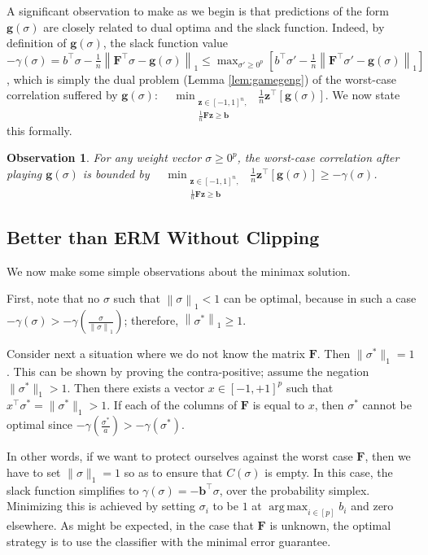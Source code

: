 \documentclass{colt2015} %
\newtheorem{obs}[thm]{Observation}
\newcommand{\vF}{\mathbf{F}}
\newcommand{\vb}{\mathbf{b}}
\newcommand{\vg}{\mathbf{g}}
\newcommand{\vz}{\mathbf{z}}
\DeclareMathOperator*{\argmax}{arg\,max}
\newcommand{\vnorm}[1]{\left\lVert#1\right\rVert} %
\newcommand{\lrp}[1]{\left(#1\right)}
\begin{document}
A significant observation to make as we begin 
is that predictions of the form $\vg (\sigma)$ 
are closely related to dual optima and the slack function. 
Indeed, by definition of $\vg (\sigma)$, the slack function value 
$ - \gamma (\sigma) = b^\top \sigma - \frac{1}{n} \vnorm{\vF^\top \sigma - \vg (\sigma)}_1 
\leq \max_{\sigma' \geq 0^p} \left[ b^\top \sigma' - \frac{1}{n} \vnorm{\vF^\top \sigma' - \vg (\sigma)}_1 \right]$, 
which is simply the dual problem (Lemma \ref{lem:gamegeng}) of the worst-case correlation suffered by $\vg (\sigma)$: 
$\displaystyle \quad \min_{\substack{ \vz \in [-1,1]^n , \\ \frac{1}{n} \vF \vz \geq \vb }} \;\frac{1}{n} \vz^\top [\vg (\sigma)]$. 
We now state this formally.
\begin{obs}
\label{obs:slacksubopt}
For any weight vector $\sigma \geq 0^p$, 
the worst-case correlation after playing $\vg (\sigma)$ is bounded by 
$\displaystyle \quad \min_{\substack{ \vz \in [-1,1]^n , \\ \frac{1}{n} \vF \vz \geq \vb }} \;\frac{1}{n} \vz^\top [\vg (\sigma)] 
\geq - \gamma (\sigma) $\;.
\end{obs}
\fi

\subsection{Better than ERM Without Clipping}
We now make some simple observations about the minimax solution.

First, note that no $\sigma$ such that $\vnorm{\sigma}_1 < 1$ can be optimal, 
because in such a case $-\gamma(\sigma) > -\gamma \lrp{\frac{\sigma}{\vnorm{\sigma}_1}}$; 
therefore, $\vnorm{\sigma^*}_1 \geq 1$.

Consider next a situation where we do not know the matrix $\vF$. 
Then $\|\sigma^*\|_1=1$. This can be shown by proving the contra-positive; 
assume the negation $\|\sigma^*\|_1 > 1$. Then there exists a 
vector $x \in [-1,+1]^p$ such that $x^\top \sigma^* = \|\sigma^*\|_1 > 1$. 
If each of the columns of $\vF$ is equal to $x$, 
then $\sigma^*$ cannot be optimal since 
$-\gamma \lrp{\frac{\sigma^*}{a}} > -\gamma(\sigma^*)$. 

In other words, if we want to protect ourselves against the worst case $\vF$, then
we have to set $\|\sigma\|_1=1$ so as to ensure that $C(\sigma)$ is empty. 
In this case, the slack function simplifies to $\gamma (\sigma) = - \vb^\top \sigma$, 
over the probability simplex. 
Minimizing this is achieved by setting $\sigma_i$ to be $1$ at $\displaystyle \argmax_{i \in [p]} b_i$ and zero
elsewhere. As might be expected, in the case that $\vF$ is unknown, the
optimal strategy is to use the classifier with the minimal error guarantee. 
\end{document}
